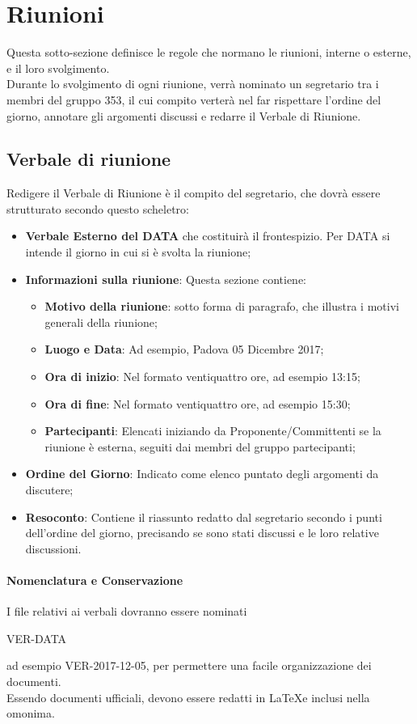 \documentclass[NormeDiProgetto.tex]{subfiles}
\begin{document}
	\section{Riunioni}
	Questa sotto-sezione definisce le regole che normano le riunioni, interne o esterne, e il loro svolgimento.\\
	Durante lo svolgimento di ogni riunione, verrà nominato un segretario tra i membri del gruppo 353, il cui compito verterà nel far rispettare l'ordine del giorno, annotare gli argomenti discussi e redarre il Verbale di Riunione.
	\subsection{Verbale di riunione}
	Redigere il Verbale di Riunione è il compito del segretario, che dovrà essere strutturato secondo questo scheletro:
	\begin{itemize}
		\item \textbf{Verbale Esterno del DATA} che costituirà il frontespizio. Per DATA si intende il giorno in cui si è svolta la riunione;
		\item \textbf{Informazioni sulla riunione}: Questa sezione contiene:
		\begin{itemize}
			\item \textbf{Motivo della riunione}: sotto forma di paragrafo, che illustra i motivi generali della riunione; 
			\item \textbf{Luogo e Data}: Ad esempio, Padova 05 Dicembre 2017;
			\item \textbf{Ora di inizio}: Nel formato ventiquattro ore, ad esempio 13:15;
			\item \textbf{Ora di fine}: Nel formato ventiquattro ore, ad esempio 15:30;
			\item \textbf{Partecipanti}: Elencati iniziando da Proponente/Committenti se la riunione è esterna, seguiti dai membri del gruppo partecipanti;
			\end{itemize}
			\item \textbf{Ordine del Giorno}: Indicato come elenco puntato degli argomenti da discutere;
			\item \textbf{Resoconto}: Contiene il riassunto redatto dal segretario secondo i punti dell'ordine del giorno, precisando se sono stati discussi e le loro relative discussioni.

	\end{itemize}
	\paragraph{Nomenclatura e Conservazione} I file relativi ai verbali dovranno essere nominati
	\begin{center}
		VER-DATA
	\end{center}
	ad esempio VER-2017-12-05, per permettere una facile organizzazione dei documenti.\\
	Essendo documenti ufficiali, devono essere redatti in \LaTeX e inclusi nella  omonima.
	
\end{document}
